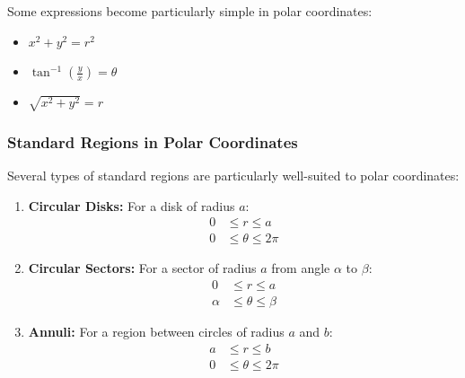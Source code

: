 \noindent Some expressions become particularly simple in polar coordinates:
\begin{itemize}
   \item $x^2 + y^2 = r^2$
   \item $\tan^{-1}(\frac{y}{x}) = \theta$
   \item $\sqrt{x^2 + y^2} = r$
\end{itemize}


\subsubsection*{Standard Regions in Polar Coordinates}

\noindent Several types of standard regions are particularly well-suited to polar coordinates:

\begin{enumerate}
   \item \textbf{Circular Disks:} For a disk of radius $a$:
       \begin{align*}
       0 &\leq r \leq a \\
       0 &\leq \theta \leq 2\pi
       \end{align*}
   
   \item \textbf{Circular Sectors:} For a sector of radius $a$ from angle $\alpha$ to $\beta$:
       \begin{align*}
       0 &\leq r \leq a \\
       \alpha &\leq \theta \leq \beta
       \end{align*}
   
   \item \textbf{Annuli:} For a region between circles of radius $a$ and $b$:
       \begin{align*}
       a &\leq r \leq b \\
       0 &\leq \theta \leq 2\pi
       \end{align*}
\end{enumerate}

